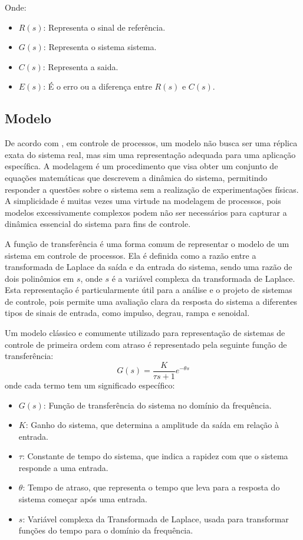 Onde:
\begin{itemize}
    \item $R(s)$: Representa o sinal de referência.
    \item $G(s)$: Representa o sistema sistema.
    \item $C(s)$: Representa a saida.
    \item $E(s)$: É o erro ou a diferença entre $R(s)$ e $C(s)$.
\end{itemize}

\subsection{Modelo}

De acordo com \cite{CoelhoIdentificacao}, em controle de processos, um modelo não busca ser uma réplica exata do
sistema real, mas sim uma representação adequada para uma aplicação específica.
A modelagem é um procedimento que visa obter um conjunto de equações matemáticas que descrevem a dinâmica do sistema,
permitindo responder a questões sobre o sistema sem a realização de experimentações físicas.
A simplicidade é muitas vezes uma virtude na modelagem de processos, pois modelos excessivamente complexos podem
não ser necessários para capturar a dinâmica essencial do sistema para fins de controle.

A função de transferência é uma forma comum de representar o modelo de um sistema em controle de processos.
Ela é definida como a razão entre a transformada de Laplace da saída e da entrada do sistema,
sendo uma razão de dois polinômios em $s$, onde $s$ é a variável complexa da transformada de Laplace.
Esta representação é particularmente útil para a análise e o projeto de sistemas de controle,
pois permite uma avaliação clara da resposta do sistema a diferentes tipos de sinais de entrada,
como impulso, degrau, rampa e senoidal.

Um modelo clássico e comumente utilizado para representação de sistemas de controle de primeira ordem com atraso é
representado pela seguinte função de transferência:
\begin{equation}
    \label{eq:firstordertf}
    G(s) = \frac{K}{\tau s + 1}e^{-\theta s}
\end{equation}
onde cada termo tem um significado específico:
\begin{itemize}
    \item $G(s)$: Função de transferência do sistema no domínio da frequência.
    \item $K$: Ganho do sistema, que determina a amplitude da saída em relação à entrada.
    \item $\tau$: Constante de tempo do sistema, que indica a rapidez com que o sistema responde a uma entrada.
    \item $\theta$: Tempo de atraso, que representa o tempo que leva para a resposta do sistema começar após uma entrada.
    \item $s$: Variável complexa da Transformada de Laplace, usada para transformar funções do tempo para o domínio da frequência.
\end{itemize}


